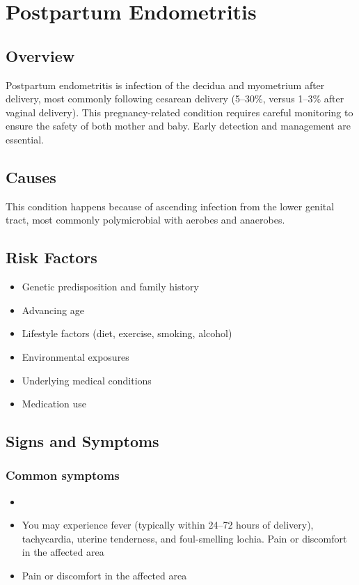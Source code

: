 \chapter{Postpartum Endometritis}
\label{sec:Postpartum Endometritis}

\section{Overview}
Postpartum endometritis is infection of the decidua and myometrium after delivery, most commonly following cesarean delivery (5--30\%, versus 1--3\% after vaginal delivery). This pregnancy-related condition requires careful monitoring to ensure the safety of both mother and baby. Early detection and management are essential.
\section{Causes}
This condition happens because of ascending infection from the lower genital tract, most commonly polymicrobial with aerobes and anaerobes.     
\section{Risk Factors}

\begin{itemize}[noitemsep]
  \item Genetic predisposition and family history
  \item Advancing age
  \item Lifestyle factors (diet, exercise, smoking, alcohol)
  \item Environmental exposures
  \item Underlying medical conditions
  \item Medication use
\end{itemize}
\section{Signs and Symptoms}

\subsection{Common symptoms}
\begin{itemize}[noitemsep]
  \item \item You may experience fever (typically within 24--72 hours of delivery), tachycardia, uterine tenderness, and foul-smelling lochia. Pain or discomfort in the affected area    \item Pain or discomfort in the affected area
  \end{itemize}

